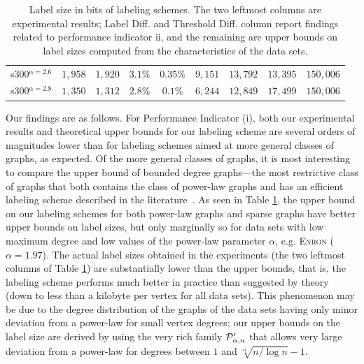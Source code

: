 \begin{table}
\begin{tabular}{ccccccccc}
s300$^{\alpha=2.6}$ &$1,958$    &$1,920$  & $3.1\%$ & $0.35\%$   & $9,151 $  &$13,792$     &$13,395$  &$150,006$\\
s300$^{\alpha=2.8}$ &$1,350$    &$1,312$  & $2.8\%$ & $0.1\%$   & $6,244 $  &$12,849$     &$17,499$  &$150,006$\\\hline
\end{tabular}
\caption{Label size in bits of labeling schemes. The two leftmost columns are experimental results; Label Diff. and  Threshold Diff. column  report findings related to  performance indicator ii, and the remaining are upper bounds on label sizes computed from the characteristics of the data sets.}
\label{t:labelsizes}
\end{table}

Our findings are as follows.
For Performance Indicator (i), both our experimental results and theoretical upper bounds for our labeling scheme are several orders of magnitudes lower than for labeling schemes aimed at more general classes of graphs, as expected. Of the more general classes of graphs, it is most interesting to compare the upper bound of bounded degree graphs---the most restrictive class of graphs that both contains the class of power-law graphs and has an efficient labeling scheme described in the literature~\cite{adjiashvili2014labeling}. As seen in Table \ref{t:labelsizes}, the upper bound on our labeling schemes for both power-law graphs and sparse graphs have better upper bounds on label sizes, but only marginally so for data sets with low maximum degree and low values of the power-law parameter $\alpha$, e.g. \textsc{Enron} ($\alpha = 1.97$). 
The actual label sizes obtained in the experiments (the two leftmost columns of Table \ref{t:labelsizes}) are substantially lower than the upper bounds, that is, the labeling scheme performs much better in practice than suggested by theory (down to less than a kilobyte per vertex for all data sets). 
This phenomenon may be due to the degree distribution of the graphs of the data sets having only minor deviation from a power-law for small vertex degrees; our upper bounds on the label size are derived by using the very rich family $ \mathcal{P}'_{\alpha,n}$ that allows very large deviation from a power-law for degrees between $1$ and $\sqrt[\alpha]{n/\log n} - 1$.

